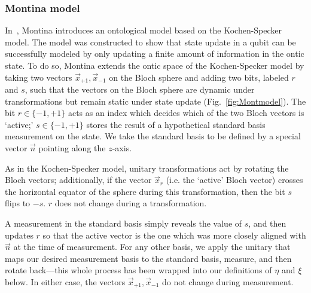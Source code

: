 \documentclass[%
 reprint,
superscriptaddress,
nofootinbib,
 amsmath,amssymb,
 prx, 
 accepted=2019-09-27,
]{quantumarticle}
\begin{document}
\subsubsection{Montina model}
\label{sec:montina-model}
In~\cite{MontinaDynamicsqubitclassical2012}, Montina introduces an
ontological model based on the Kochen-Specker model. The model was
constructed to show that state update in a qubit can be successfully
modeled by only updating a finite amount of information in the ontic
state. To do so, Montina extends the ontic space of the Kochen-Specker
model by taking two vectors $\vec x_{+1},\vec x_{-1}$ on the Bloch
sphere and adding two bits, labeled $r$ and $s$, such that the vectors
on the Bloch sphere are dynamic under transformations but remain
static under state update (Fig.~\ref{fig:Montmodel}).  The bit
$r\in\{-1,+1\}$ acts as an index which decides which of the two Bloch
vectors is `active;' $s\in\{-1,+1\}$ stores the result of a
hypothetical standard basis measurement on the state. We take the
standard basis to be defined by a special vector $\vec n$ pointing
along the $z$-axis.

As in the Kochen-Specker model, unitary transformations act by
rotating the Bloch vectors; additionally, if the vector $\vec x_r$
(i.e. the `active' Bloch vector) crosses the horizontal equator of the
sphere during this transformation, then the bit $s$ flips to $-s$. $r$
does not change during a transformation.

A measurement in the standard basis simply reveals the value of $s$,
and then updates $r$ so that the active vector is the one which was
more closely aligned with $\vec n$ at the time of measurement. For any
other basis, we apply the unitary that maps our desired measurement
basis to the standard basis, measure, and then rotate back---this
whole process has been wrapped into our definitions of $\eta$ and
$\xi$ below. In either case, the vectors $\vec x_{+1},\vec x_{-1}$ do not
change during measurement.
\end{document}
